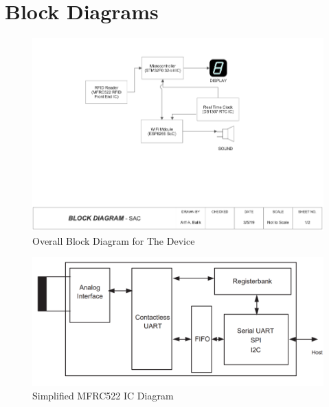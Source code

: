 \documentclass{scrreprt}
\begin{document}
\newpage
\section{Block Diagrams}
\begin{figure}[H]
 \begin{center}
	\includegraphics[scale=0.5]{bd2}
  	\caption{Overall Block Diagram for The Device}
  \end{center}
\end{figure}

\begin{figure}[H]
 \begin{center}
	\includegraphics[scale=0.3]{rc522}
  	\caption{Simplified MFRC522 IC Diagram}
  \end{center}
\end{figure}
\end{document}
